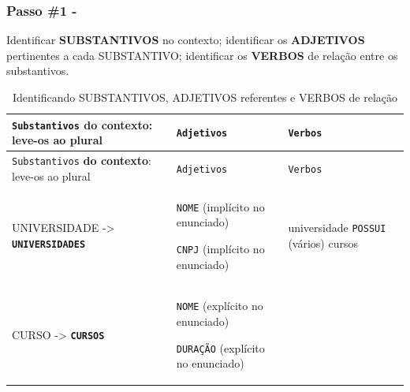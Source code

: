 \documentclass[
]{book}
\begin{document}
\subsubsection{Passo \#1 -}\label{passo-1--}

Identificar \textbf{SUBSTANTIVOS} no contexto; identificar os \textbf{ADJETIVOS} pertinentes a cada SUBSTANTIVO; identificar os \textbf{VERBOS} de relação entre os substantivos.

\begin{longtable}[]{@{}
  >{\raggedright\arraybackslash}p{}
  >{\raggedright\arraybackslash}p{}
  >{\raggedright\arraybackslash}p{}@{}}
\caption{Identificando SUBSTANTIVOS, ADJETIVOS referentes e VERBOS de relação}\tabularnewline
\toprule\noalign{}
\begin{minipage}[b]{\linewidth}\raggedright
\texttt{Substantivos} \textbf{do contexto}: leve-os ao plural
\end{minipage} & \begin{minipage}[b]{\linewidth}\raggedright
\texttt{Adjetivos}
\end{minipage} & \begin{minipage}[b]{\linewidth}\raggedright
\texttt{Verbos}
\end{minipage} \\
\midrule\noalign{}
\endfirsthead
\toprule\noalign{}
\begin{minipage}[b]{\linewidth}\raggedright
\texttt{Substantivos} \textbf{do contexto}: leve-os ao plural
\end{minipage} & \begin{minipage}[b]{\linewidth}\raggedright
\texttt{Adjetivos}
\end{minipage} & \begin{minipage}[b]{\linewidth}\raggedright
\texttt{Verbos}
\end{minipage} \\
\midrule\noalign{}
\endhead
\bottomrule\noalign{}
\endlastfoot
UNIVERSIDADE -\textgreater{} \textbf{\texttt{UNIVERSIDADES}} & \texttt{NOME} (implícito no enunciado)

\texttt{CNPJ} (implícito no enunciado) & universidade \texttt{POSSUI} (vários) cursos \\
CURSO -\textgreater{} \textbf{\texttt{CURSOS}} & \texttt{NOME} (explícito no enunciado)

\texttt{DURAÇÃO} (explícito no enunciado)


\end{longtable}
\end{document}
